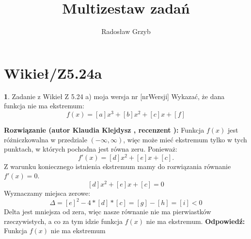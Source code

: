 \documentclass[12pt, a4paper]{article}
\title{Multizestaw zadań}
\author{Radosław Grzyb}
\date{}
\theoremstyle{definition} %
\newtheorem{zad}{}
\newcommand{\kategoria}[1]{\section{#1}} %
\newcommand{\zadStart}[1]{\begin{zad}#1\newline} %
\newcommand{\zadStop}{\end{zad}}   %
\newcommand{\rozwStart}[2]{\noindent \textbf{Rozwiązanie (autor #1 , recenzent #2): }\newline} %
\newcommand{\rozwStop}{\newline}                                            %
\newcommand{\odpStart}{\noindent \textbf{Odpowiedź:}\newline}    %
\newcommand{\odpStop}{\newline}                                             %
\begin{document}
\maketitle


\kategoria{Wikieł/Z5.24a}
\zadStart{Zadanie z Wikieł Z 5.24 a) moja wersja nr [nrWersji]}
Wykazać, że dana funkcja nie ma ekstremum:
$$f(x)=[a]x^3+[b]x^2+[c]x+[f]$$
\zadStop
\rozwStart{Klaudia Klejdysz}{}
Funkcja $f(x)$ jest różniczkowalna w przedziale $(-\infty,\infty)$, więc może mieć ekstremum tylko w tych punktach, w których pochodna jest równa zeru. Ponieważ:
$$f'(x)=[d]x^2+[e]x+[c]\text{.}$$
Z warunku koniecznego istnienia ekstremum mamy do rozwiązania równanie $f'(x)=0$.
$$[d]x^2+[e]x+[c]=0$$
Wyznaczamy miejsca zerowe:
$$\Delta=[e]^2-4*[d]*[c]=[g]-[h]=[i]<0$$
Delta jest mniejsza od zera, więc nasze równanie nie ma pierwiastków rzeczywistych, a co za tym idzie funkcja $f(x)$ nie ma ekstremum.
\rozwStop
\odpStart
Funkcja $f(x)$ nie ma ekstremum
\odpStop
\end{document}

